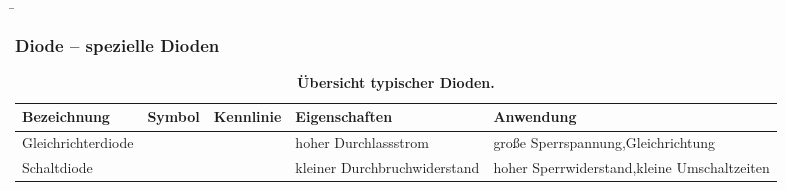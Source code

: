 \begin{frame}
    \b{
        \frametitle{Diode -- spezielle Dioden}
        \begin{table}[H]
            \centering 
            \begin{tabular}{ |p{2.1cm}|p{1.4cm}|p{3.2cm}|p{2.8cm}|p{3cm}| }
                \hline
                \textbf{Bezeichnung} & \textbf{Symbol} & \textbf{Kennlinie} & \textbf{Eigenschaften} & \textbf{Anwendung} \\
                \hline
                Gleich\-richter\-diode  
                &
                \begin{minipage}[t][2.6cm][c]{1.4cm}
                    \centering 
                \end{minipage}
                & 
                \begin{minipage}[t][2.6cm][c]{3.3cm}
                    \centering 
                \end{minipage}
                & 
                hoher Durchlassstrom &
                 große Sperrspannung,\newline Gleichrichtung\\
                \hline
                Schalt\-diode 
                &
                \begin{minipage}[t][2.6cm][c]{1.4cm}
                    \centering 
                \end{minipage}
                & 
                \begin{minipage}[t][2.6cm][c]{3.3cm}
                    \centering 
                \end{minipage}
                & 
                kleiner Durchbruchwiderstand &
                hoher Sperrwiderstand,\newline kleine Umschaltzeiten\\
                \hline
            \end{tabular}
            \caption{\textbf{Übersicht typischer Dioden.}}
        \end{table}
    }

\end{frame}

